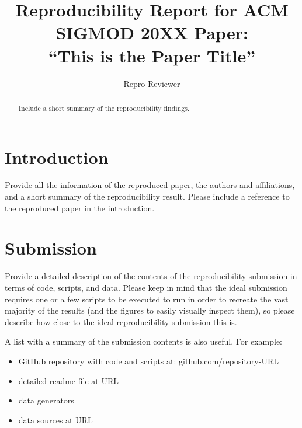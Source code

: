 \documentclass[acmsmall,nonacm]{acmart}
\begin{document}
\title{Reproducibility Report for ACM SIGMOD 20XX Paper:\\ ``This is the Paper Title''}

\author{Repro Reviewer}



\begin{abstract}
Include a short summary of the reproducibility findings.
\end{abstract}




\maketitle


\section{Introduction}
Provide all the information of the reproduced paper, the authors and affiliations, and a short summary of the reproducibility result. Please include a reference to the reproduced paper in the introduction.

\section{Submission} 
Provide a detailed description of the contents of the reproducibility submission in terms of code, scripts, and data. Please keep in mind that the ideal submission requires one or a few scripts to be executed to run in order to recreate the vast majority of the results (and the figures to easily visually inspect them), so please describe how close to the ideal reproducibility submission this is. 

A list with a summary of the submission contents is also useful. For example:
\begin{itemize}
\item GitHub repository with code and scripts at: github.com/repository-URL
\item detailed readme file at URL
\item data generators
\item data sources at URL	
\end{itemize}
\end{document}
